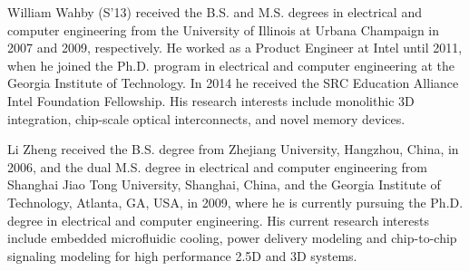 \documentclass[journal,twoside]{IEEEtran}
\begin{document}



\vspace{-0.3in}

\begin{IEEEbiography}%
{William Wahby}
(S'13) received the B.S. and M.S. degrees in electrical and computer engineering from the
University of Illinois at Urbana Champaign in 2007 and 2009, respectively. He worked
as a Product Engineer at Intel until 2011, when he
joined the Ph.D. program in electrical
and computer engineering at the Georgia Institute
of Technology. In 2014 he received the SRC Education Alliance
Intel Foundation Fellowship.
His research interests include monolithic 3D integration, chip-scale optical interconnects, 
and novel memory devices.
\end{IEEEbiography}

\vspace{-0.3in}

\begin{IEEEbiography}%
{Li Zheng}
received the B.S. degree from Zhejiang
University, Hangzhou, China, in 2006, and the dual
M.S. degree in electrical and computer engineering
from Shanghai Jiao Tong University, Shanghai,
China, and the Georgia Institute of Technology,
Atlanta, GA, USA, in 2009, where he is currently
pursuing the Ph.D. degree in electrical and computer
engineering.
His current research interests include embedded
microfluidic cooling, power delivery modeling
and chip-to-chip signaling modeling for high performance
2.5D and 3D systems.
\end{IEEEbiography}
\end{document}
